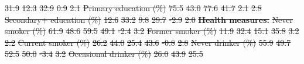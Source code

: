 \documentclass[
  letterpaper,
  DIV=11,
  numbers=noendperiod]{scrartcl}
\makeatletter
\renewenvironment{table}%
   {\renewcommand\familydefault\sfdefault
    \@float{table}}
   {\end@float}
\providecommand{\DIFdel}[1]{{\protect\color{red}\sout{#1}}}                      %
\providecommand{\DIFdelFL}[1]{\DIFdel{#1}} %
\makeatother
\begin{document}
\begin{table}
\DIFdelFL{31.9 }%
\DIFdelFL{12.3 }%
\DIFdelFL{32.9 }%
\DIFdelFL{0.9 }%
\DIFdelFL{2.1}%
\DIFdelFL{Primary education (\%) }%
\DIFdelFL{75.5 }%
\DIFdelFL{43.0 }%
\DIFdelFL{77.6 }%
\DIFdelFL{41.7 }%
\DIFdelFL{2.1 }%
\DIFdelFL{2.8}%
\DIFdelFL{Secondary+ education (\%) }%
\DIFdelFL{12.6 }%
\DIFdelFL{33.2 }%
\DIFdelFL{9.8 }%
\DIFdelFL{29.7 }%
\DIFdelFL{-2.9 }%
\DIFdelFL{2.0}%
\textbf{\DIFdelFL{Health measures:}} %
\textbf{} %
\textbf{} %
\textbf{} %
\textbf{} %
\textbf{} %
\textbf{}%
\DIFdelFL{Never smoker (\%) }%
\DIFdelFL{61.9 }%
\DIFdelFL{48.6 }%
\DIFdelFL{59.5 }%
\DIFdelFL{49.1 }%
\DIFdelFL{-2.4 }%
\DIFdelFL{3.2}%
\DIFdelFL{Former smoker (\%) }%
\DIFdelFL{11.9 }%
\DIFdelFL{32.4 }%
\DIFdelFL{15.1 }%
\DIFdelFL{35.8 }%
\DIFdelFL{3.2 }%
\DIFdelFL{2.2}%
\DIFdelFL{Current smoker (\%) }%
\DIFdelFL{26.2 }%
\DIFdelFL{44.0 }%
\DIFdelFL{25.4 }%
\DIFdelFL{43.6 }%
\DIFdelFL{-0.8 }%
\DIFdelFL{2.8}%
\DIFdelFL{Never drinker (\%) }%
\DIFdelFL{55.9 }%
\DIFdelFL{49.7 }%
\DIFdelFL{52.5 }%
\DIFdelFL{50.0 }%
\DIFdelFL{-3.4 }%
\DIFdelFL{3.2}%
\DIFdelFL{Occasional drinker (\%) }%
\DIFdelFL{26.0 }%
\DIFdelFL{43.9 }%
\DIFdelFL{25.5 }%

\end{table}
\end{document}

